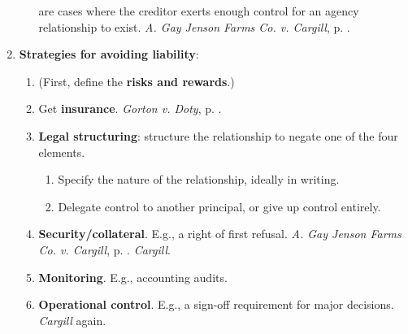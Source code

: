 \begin{enumerate}
\begin{enumerate}
        are cases where the creditor exerts enough control for an agency 
        relationship to exist. \emph{A. Gay Jenson Farms Co. v. Cargill}, p. 
        \pageref{subsub:cargill}.
    \end{enumerate}
    \item \textbf{Strategies for avoiding liability}:
    \begin{enumerate}
        \item (First, define the \textbf{risks and rewards}.)
        \item Get \textbf{insurance}. \emph{Gorton v. Doty}, p.
        \pageref{subsub:gorton}.
        \item \textbf{Legal structuring}: structure the relationship to negate 
        one of the four elements.
        \begin{enumerate}
            \item Specify the nature of the relationship, ideally in writing.
            \item Delegate control to another principal, or give up control 
            entirely.
        \end{enumerate}
        \item \textbf{Security/collateral}. E.g., a right of first refusal. 
        \emph{A. Gay Jenson Farms Co. v. Cargill}, p.  
        \pageref{subsub:cargill}. \emph{Cargill}.
        \item \textbf{Monitoring}. E.g., accounting audits.
        \item \textbf{Operational control}. E.g., a sign-off requirement for 
        major decisions. \emph{Cargill} again.
    \end{enumerate}
\end{enumerate}

